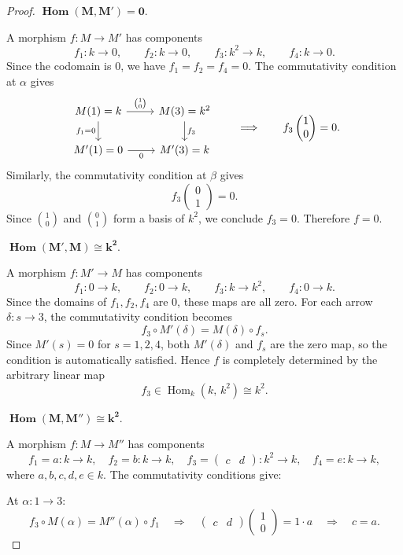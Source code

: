 \documentclass[11pt, a4paper]{article}
\begin{document}
\begin{enumerate}[leftmargin=*, label=\textbf{\arabic*.}]
\begin{enumerate}[label=(\alph*)]
\begin{proof}
    \medskip\noindent$\boldsymbol{\operatorname{Hom}(M,M')=0.}$
    
    A morphism $f\colon M\to M'$ has components
    \[
    f_1\colon k\to 0,\qquad f_2\colon k\to 0,\qquad f_3\colon k^2\to k,\qquad f_4\colon k\to 0.
    \]
    Since the codomain is $0$, we have $f_1=f_2=f_4=0$. The commutativity condition at $\alpha$ gives
    \[
    \begin{tikzcd}
    M(1) = k \arrow[r, "\binom{1}{0}"] \arrow[d, "f_1=0"'] & M(3) = k^2 \arrow[d, "f_3"] \\
    M'(1) = 0 \arrow[r, "0"'] & M'(3) = k
    \end{tikzcd}
    \qquad\Longrightarrow\qquad
    f_3\begin{pmatrix}1\\0\end{pmatrix} = 0.
    \]
    Similarly, the commutativity condition at $\beta$ gives
    \[
    f_3\begin{pmatrix}0\\1\end{pmatrix} = 0.
    \]
    Since $\binom{1}{0}$ and $\binom{0}{1}$ form a basis of $k^2$, we conclude $f_3=0$. Therefore $f=0$.

    \medskip\noindent$\boldsymbol{\operatorname{Hom}(M',M)\cong k^2.}$
    
    A morphism $f\colon M'\to M$ has components
    \[
    f_1\colon 0\to k,\qquad f_2\colon 0\to k,\qquad f_3\colon k\to k^2,\qquad f_4\colon 0\to k.
    \]
    Since the domains of $f_1,f_2,f_4$ are $0$, these maps are all zero. For each arrow $\delta\colon s\to 3$, the commutativity condition becomes
    \[
    f_3 \circ M'(\delta) = M(\delta)\circ f_s.
    \]
    Since $M'(s)=0$ for $s=1,2,4$, both $M'(\delta)$ and $f_s$ are the zero map, so the condition is automatically satisfied. Hence $f$ is completely determined by the arbitrary linear map
    \[
    f_3 \in \operatorname{Hom}_k(k,\,k^2) \cong k^2.
    \]

    \medskip\noindent$\boldsymbol{\operatorname{Hom}(M,M'')\cong k^2.}$
    
    A morphism $f\colon M\to M''$ has components
    \[
    f_1 = a\colon k\to k,\quad f_2 = b\colon k\to k,\quad f_3 = \begin{pmatrix}c&d\end{pmatrix}\colon k^2\to k,\quad f_4 = e\colon k\to k,
    \]
    where $a,b,c,d,e\in k$. The commutativity conditions give:
    
    At $\alpha\colon 1\to 3$:
    \[
    f_3\circ M(\alpha) = M''(\alpha)\circ f_1 \quad\Longrightarrow\quad \begin{pmatrix}c&d\end{pmatrix}\begin{pmatrix}1\\0\end{pmatrix} = 1\cdot a \quad\Longrightarrow\quad c = a.
    \]
    

\end{proof}
\end{enumerate}
\end{enumerate}
\end{document}
